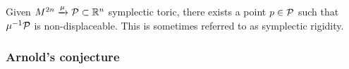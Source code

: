 \begin{thm}
	Given $M^{2n}\xrightarrow\mu\mathcal{P}\subset\mathbb{R}^n$ symplectic toric, there exists a point $p\in\mathcal{P}$ such that $\mu^{-1}\mathcal{P}$ is non-displaceable.
	This is sometimes referred to as symplectic rigidity.
\end{thm}

\begin{remark}
\end{remark}

\subsubsection*{Arnold's conjecture}
